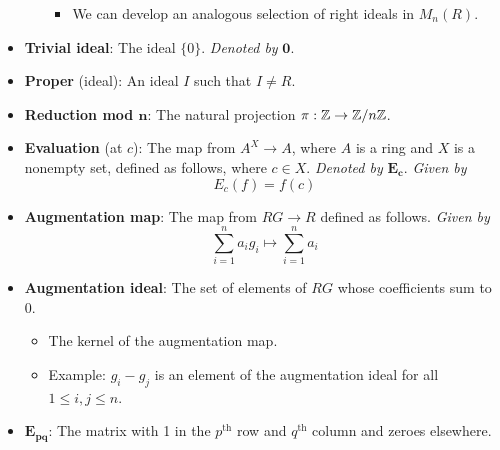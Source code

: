 \documentclass[../notes.tex]{subfiles}
\begin{document}
\begin{itemize}
\begin{enumerate}
\begin{itemize}
            \item We can develop an analogous selection of right ideals in $M_n(R)$.
        \end{itemize}
    \end{enumerate}
    \item \textbf{Trivial ideal}: The ideal $\{0\}$. \emph{Denoted by} $\bm{0}$.
    \item \textbf{Proper} (ideal): An ideal $I$ such that $I\neq R$.
    \item \textbf{Reduction mod $\bm{n}$}: The natural projection $\pi:\mathbb{Z}\to\mathbb{Z}/n\mathbb{Z}$.
    \item \textbf{Evaluation} (at $c$): The map from $A^X\to A$, where $A$ is a ring and $X$ is a nonempty set, defined as follows, where $c\in X$. \emph{Denoted by} $\bm{E_c}$. \emph{Given by}
    \begin{equation*}
        E_c(f) = f(c)
    \end{equation*}
    \item \textbf{Augmentation map}: The map from $RG\to R$ defined as follows. \emph{Given by}
    \begin{equation*}
        \sum_{i=1}^na_ig_i \mapsto \sum_{i=1}^na_i
    \end{equation*}
    \item \textbf{Augmentation ideal}: The set of elements of $RG$ whose coefficients sum to 0.
    \begin{itemize}
        \item The kernel of the augmentation map.
        \item Example: $g_i-g_j$ is an element of the augmentation ideal for all $1\leq i,j\leq n$.
    \end{itemize}
    \item $\bm{E_{pq}}$: The matrix with 1 in the $p^\text{th}$ row and $q^\text{th}$ column and zeroes elsewhere.
\end{itemize}
\end{document}
